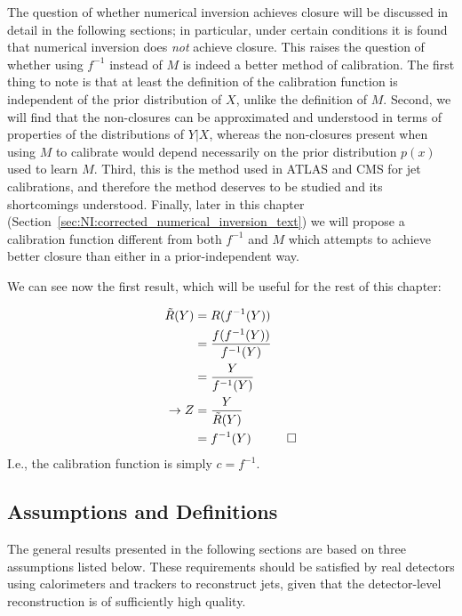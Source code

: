 The question of whether numerical inversion achieves closure will be discussed in detail in the following sections; in particular, under certain conditions it is found that numerical inversion does \emph{not} achieve closure.
This raises the question of whether using $f^{-1}$ instead of $M$ is indeed a better method of calibration.
The first thing to note is that at least the definition of the calibration function is independent of the prior distribution of $X$, unlike the definition of $M$.
Second, we will find that the non-closures can be approximated and understood in terms of properties of the distributions of $Y|X$, whereas the non-closures present when using $M$ to calibrate would depend necessarily on the prior distribution $p(x)$ used to learn $M$.
Third, this is the method used in ATLAS and CMS for jet calibrations, and therefore the method deserves to be studied and its shortcomings understood.
Finally, later in this chapter (Section~\ref{sec:NI:corrected_numerical_inversion_text}) we will propose a calibration function different from both $f^{-1}$ and $M$ which attempts to achieve better closure than either in a prior-independent way.

We can see now the first result, which will be useful for the rest of this chapter:
\vspace{6mm}


\begin{align}
\tilde{R}(Y) &= R(f^{-1}(Y))\nonumber\\
&= \frac{f(f^{-1}(Y))}{f^{-1}(Y)}\nonumber\\
&= \frac{Y}{f^{-1}(Y)}\nonumber\\
\rightarrow Z &= \frac{Y}{\tilde{R}(Y)}\nonumber\\
&= f^{-1}(Y) \hspace{1 cm} \Box
\end{align}
I.e., the calibration function is simply $c=f^{-1}$.

\subsection{Assumptions and Definitions}
\label{sec:NI:assumptions}

The general results presented in the following sections are based on three assumptions listed below.  These requirements should be satisfied by real detectors using calorimeters and trackers to reconstruct jets, given that the detector-level reconstruction is of sufficiently high quality.


